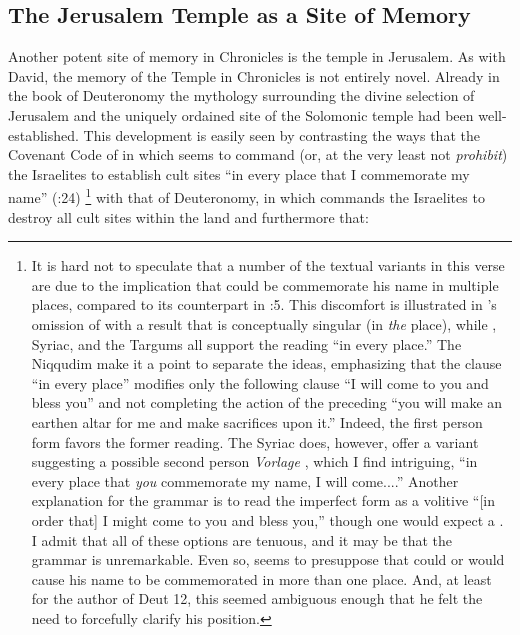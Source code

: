 \subsection{The Jerusalem Temple as a Site of Memory}
Another potent site of memory in Chronicles is the temple in Jerusalem. As with David, the memory of the Temple in Chronicles is not entirely novel. Already in the book of Deuteronomy the mythology surrounding the divine selection of Jerusalem and the uniquely ordained site of the Solomonic temple had been well-established. This development is easily seen by contrasting the ways that the Covenant Code of  in which \yahweh seems to command (or, at the very least not \emph{prohibit}) the Israelites to establish cult sites  ``in every place that I commemorate my name'' (:24)%
    \footnote{It is hard not to speculate that a number of the textual variants in this verse are due to the implication that \yahweh could be commemorate his name in multiple places, compared to its counterpart in :5. This discomfort is illustrated in  \sampent's omission of  with a result that  is conceptually singular (in \emph{the} place), while \lxx, Syriac, and the Targums all support the reading ``in every place.'' The Niqqudim make it a point to separate the ideas, emphasizing that the clause  ``in every place'' modifies only the following clause  ``I will come to you and bless you'' and not completing the action of the preceding  ``you will make an earthen altar for me and make sacrifices upon it.'' Indeed, the first person form  favors the former reading. The Syriac does, however, offer a variant suggesting a possible second person \emph{Vorlage} , which I find intriguing, ``in every place that \emph{you} commemorate my name, I will come....'' Another explanation for the grammar is to read the imperfect form  as a volitive ``[in order that] I might come to you and bless you,'' though one would expect a . I admit that all of these options are tenuous, and it may be that the grammar is unremarkable. Even so,  seems to presuppose that \yahweh could or would cause his name to be commemorated in more than one place. And, at least for the author of Deut 12, this seemed ambiguous enough that he felt the need to forcefully clarify his position.}
with that of Deuteronomy, in which \yahweh commands the Israelites to destroy all cult sites within the land and furthermore that: 


